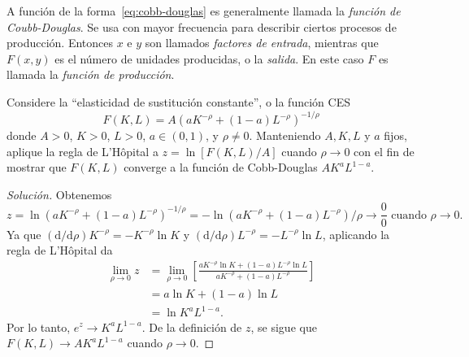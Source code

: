 A función de la forma~\eqref{eq:cobb-douglas} es generalmente llamada la \emph{función de Coubb-Douglas}. Se usa con mayor frecuencia para describir ciertos procesos de producción. Entonces $x$ e $y$ son llamados \emph{factores de entrada}, mientras que $F\left(x,y\right)$ es el número de unidades producidas, o la \emph{salida}. En este caso $F$ es llamada la \emph{función de producción}.


\begin{example}
	Considere la ``elasticidad de sustitución constante'', o la función \textsc{CES}
	\begin{equation}
	F\left(K,L\right)=A\left(aK^{-\rho}+\left(1-a\right)L^{-\rho}\right)^{-1/\rho}
	\end{equation}
	donde $A>0$, $K>0$, $L>0$, $a\in\left(0,1\right)$, y $\rho\neq 0$. Manteniendo $A,K,L$ y $a$ fijos, aplique la regla de L'H\^{o}pital a $z=\ln\left[F\left(K,L\right)/A\right]$  cuando $\rho\to0$ con el fin de mostrar que $F\left(K,L\right)$ converge a la función de Cobb-Douglas $AK^{a}L^{1-a}$.
\end{example}

\begin{proof}[Solución]
	Obtenemos \[ z=\ln{\left(aK^{-\rho}+\left(1-a\right)L^{-\rho}\right)}^{-1/\rho}=-\ln\left(aK^{-\rho}+\left(1-a\right)L^{-\rho}\right)/\rho\to\frac{0}{0}\text{ cuando }\rho\to0. \] Ya que $\left(\mathrm{d}/\mathrm{d}\rho\right)K^{-\rho}=-K^{-\rho}\ln K$ y $\left(\mathrm{d}/\mathrm{d}\rho\right)L^{-\rho}=-L^{-\rho}\ln L$, aplicando la regla de L'H\^{o}pital da
	\begin{align*}
	\lim_{\rho\to0}z
	&=\lim_{\rho\to0}\left[\frac{aK^{-\rho}\ln K + \left(1-a\right)L^{-\rho}\ln L}{aK^{-\rho}+\left(1-a\right)L^{-\rho}}\right]\\
	&=a\ln K+\left(1-a\right)\ln L\\
	&=\ln K^{a}L^{1-a}.
	\end{align*}
	Por lo tanto, $e^{z}\to K^{a}L^{1-a}$. De la definición de $z$, se sigue que $F\left(K,L\right)\to AK^{a}L^{1-a}$ cuando $\rho\to0$.
\end{proof}

